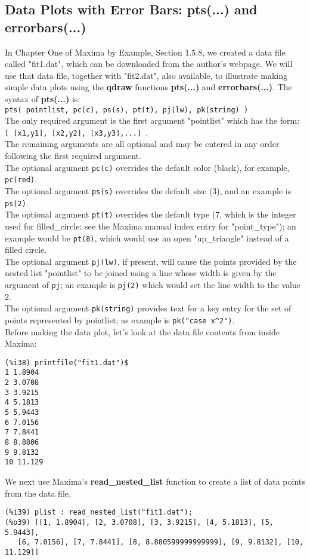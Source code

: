\documentclass[12pt]{article}
\begin{document}
\subsection{Data Plots with Error Bars: pts(...) and errorbars(...)}
In Chapter One of Maxima by Example, Section 1.5.8, we created a data file
  called "fit1.dat", which can be downloaded from the author's webpage.
We will use that data file, together with "fit2.dat", also available, to illustrate
  making simple data plots using the \textbf{qdraw} functions \textbf{pts(...)} and
  \textbf{errorbars(...)}.
The syntax of \textbf{pts(...)} is:\\
\verb|pts( pointlist, pc(c), ps(s), pt(t), pj(lw), pk(string) ) |\\
The only required argument is the first argument "pointlist" which 
  has the form: \\      \verb|[ [x1,y1], [x2,y2], [x3,y3],...] |.\\
The remaining arguments are all optional and may be entered in any
  order following the first required argument.\\
The optional argument \verb|pc(c)| overrides the default color (black), 
  for example, \verb|pc(red)|.\\
The optional argument \verb|ps(s)| overrides the default size (3), and
  an example is \verb|ps(2)|.\\
The optional argument \verb|pt(t)| overrides the default type (7, which is
  the integer used for filled\_circle: see the Maxima manual index entry
  for "point\_type"); an example would be \verb|pt(8)|, which would use
  an open "up\_triangle" instead of a filled circle.\\
The optional argument \verb|pj(lw)|, if present, will cause the points
  provided by the nested list "pointlist" to be joined using a line
  whose width is given by the argument of \verb|pj|; an example is
  \verb|pj(2)| which would set the line width to the value 2.\\
The optional argument \verb|pk(string)| provides text for a key
  entry for the set of points represented by pointlist; as example
  is \verb|pk("case x^2")|.\\

\smallskip
Before making the data plot, let's look at the data file contents from inside
  Maxima:
\small
\begin{verbatim}
(%i38) printfile("fit1.dat")$
1 1.8904 
2 3.0708 
3 3.9215 
4 5.1813 
5 5.9443 
6 7.0156 
7 7.8441 
8 8.8806 
9 9.8132 
10 11.129 
\end{verbatim}
\normalsize
We next use Maxima's \textbf{read\_nested\_list} function to create a list of
  data points from the data file.
\small
\begin{verbatim}
(%i39) plist : read_nested_list("fit1.dat");
(%o39) [[1, 1.8904], [2, 3.0708], [3, 3.9215], [4, 5.1813], [5, 5.9443], 
   [6, 7.0156], [7, 7.8441], [8, 8.880599999999999], [9, 9.8132], [10, 11.129]]
\end{verbatim}
\normalsize
\newpage
\end{document}
